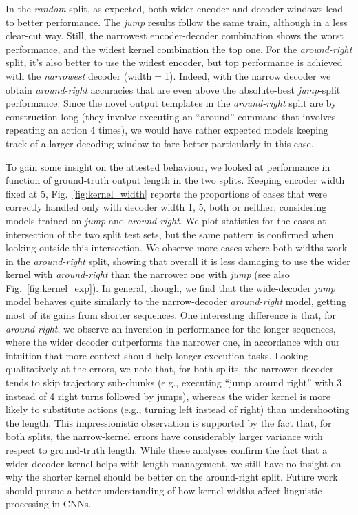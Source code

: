 
In the \emph{random} split, as expected, both wider encoder and
decoder windows lead to better performance. The \emph{jump} results
follow the same train, although in a less clear-cut way. Still, the
narrowest encoder-decoder combination shows the worst performance, and
the widest kernel combination the top one. For the
\emph{around-right} split, it's also better to use the widest encoder,
but top performance is achieved with the \emph{narrowest} decoder
(width$=$1). Indeed, with the narrow decoder we obtain
\emph{around-right} accuracies that are even above the absolute-best
\emph{jump}-split performance. Since the novel output templates in the
\emph{around-right} split are by construction long (they involve
executing an ``around'' command that involves repeating an action 4
times), we would have rather expected models keeping track of a larger
decoding window to fare better particularly in this case.

To gain some insight on the attested behaviour, we looked at
performance in function of ground-truth output length in the two
splits. Keeping encoder width fixed at 5, Fig.~\ref{fig:kernel_width}
reports the proportions of cases that were correctly handled only with
decoder width 1, 5, both or neither, considering models trained on
\emph{jump} and \emph{around-right}. We plot statistics for the cases
at intersection of the two split test sets, but the same pattern is
confirmed when looking outside this intersection. We observe more
cases where both widths work in the \emph{around-right} split, showing
that overall it is less damaging to use the wider kernel with
\emph{around-right} than the narrower one with \emph{jump} (see also
Fig.~\ref{fig:kernel_exp}). In general, though, we find that the
wide-decoder \emph{jump} model behaves quite similarly to the
narrow-decoder \emph{around-right} model, getting most of its gains
from shorter sequences. One interesting difference is that, for
\emph{around-right}, we observe an inversion in performance for the
longer sequences, where the wider decoder outperforms the narrower
one, in accordance with our intuition that more context should help
longer execution tasks. Looking qualitatively at the errors, we note
that, for both splits, the narrower decoder tends to skip trajectory
sub-chunks (e.g., executing ``jump around right'' with 3 instead of 4
right turns followed by jumps), whereas the wider kernel is more
likely to substitute actions (e.g., turning left instead of right)
than undershooting the length. This impressionistic observation is
supported by the fact that, for both splits, the narrow-kernel errors
have considerably larger variance with respect to ground-truth
length. While these analyses confirm the fact that a wider decoder
kernel helps with length management, we still have no insight on why
the shorter kernel should be better on the around-right split. Future
work should pursue a better understanding of how kernel widths affect
linguistic processing in CNNs.

